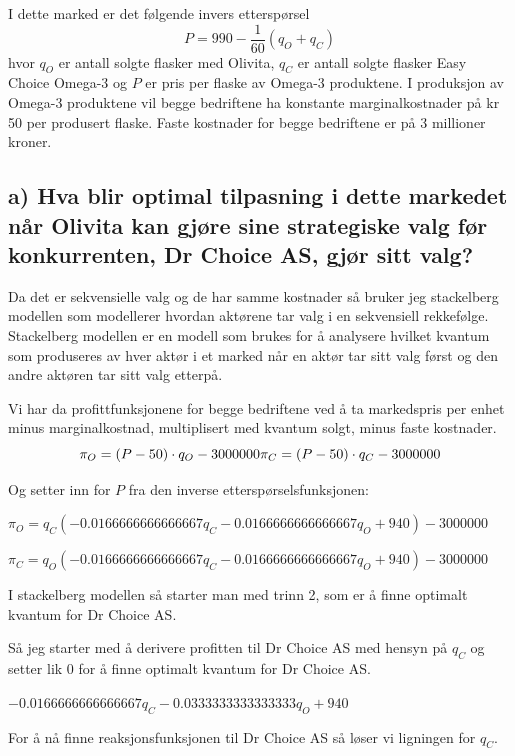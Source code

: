 \documentclass[
  12pt,
  a4paper,
  DIV=11,
  numbers=noendperiod]{scrartcl}
\begin{document}
I dette marked er det følgende invers etterspørsel \[
P = 990 - \frac{1}{60}(q_O + q_C)
\] hvor \(q_O\) er antall solgte flasker med Olivita, \(q_C\) er antall
solgte flasker Easy Choice Omega-3 og \(P\) er pris per flaske av
Omega-3 produktene. I produksjon av Omega-3 produktene vil begge
bedriftene ha konstante marginalkostnader på kr 50 per produsert flaske.
Faste kostnader for begge bedriftene er på 3 millioner kroner.

\subsection{a) Hva blir optimal tilpasning i dette markedet når Olivita kan gjøre sine strategiske valg før konkurrenten, Dr Choice AS, gjør sitt valg?}\label{a-hva-blir-optimal-tilpasning-i-dette-markedet-nuxe5r-olivita-kan-gjuxf8re-sine-strategiske-valg-fuxf8r}

Da det er sekvensielle valg og de har samme kostnader så bruker jeg
stackelberg modellen som modellerer hvordan aktørene tar valg i en
sekvensiell rekkefølge. Stackelberg modellen er en modell som brukes for
å analysere hvilket kvantum som produseres av hver aktør i et marked når
en aktør tar sitt valg først og den andre aktøren tar sitt valg etterpå.

Vi har da profittfunksjonene for begge bedriftene ved å ta markedspris
per enhet minus marginalkostnad, multiplisert med kvantum solgt, minus
faste kostnader. \[
\pi_O=(P-50) \cdot q_O-3000000 \\
\pi_C=(P-50) \cdot q_C-3000000
\]

Og setter inn for \(P\) fra den inverse etterspørselsfunksjonen:

$\displaystyle π_{O} = q_{C} \left(- 0.0166666666666667 q_{C} - 0.0166666666666667 q_{O} + 940\right) - 3000000$

$\displaystyle π_{C} = q_{O} \left(- 0.0166666666666667 q_{C} - 0.0166666666666667 q_{O} + 940\right) - 3000000$

I stackelberg modellen så starter man med trinn 2, som er å finne
optimalt kvantum for Dr Choice AS.

Så jeg starter med å derivere profitten til Dr Choice AS med hensyn på
\(q_C\) og setter lik 0 for å finne optimalt kvantum for Dr Choice AS.

$\displaystyle - 0.0166666666666667 q_{C} - 0.0333333333333333 q_{O} + 940$

For å nå finne reaksjonsfunksjonen til Dr Choice AS så løser vi
ligningen for \(q_C\).
\end{document}
